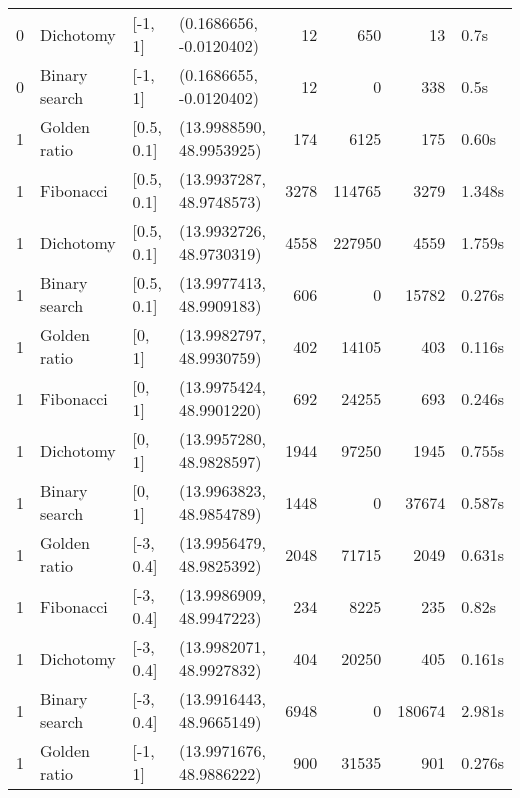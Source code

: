 \documentclass{article}
\begin{document}
\begin{tabular}{rlllrrrl}
        0 &      Dichotomy &     [-1, 1] &   (0.1686656, -0.0120402) &          12 &             650 &              13 &         0.7s \\
        0 &  Binary search &     [-1, 1] &   (0.1686655, -0.0120402) &          12 &               0 &             338 &         0.5s \\
        1 &   Golden ratio &  [0.5, 0.1] &  (13.9988590, 48.9953925) &         174 &            6125 &             175 &        0.60s \\
        1 &      Fibonacci &  [0.5, 0.1] &  (13.9937287, 48.9748573) &        3278 &          114765 &            3279 &       1.348s \\
        1 &      Dichotomy &  [0.5, 0.1] &  (13.9932726, 48.9730319) &        4558 &          227950 &            4559 &       1.759s \\
        1 &  Binary search &  [0.5, 0.1] &  (13.9977413, 48.9909183) &         606 &               0 &           15782 &       0.276s \\
        1 &   Golden ratio &      [0, 1] &  (13.9982797, 48.9930759) &         402 &           14105 &             403 &       0.116s \\
        1 &      Fibonacci &      [0, 1] &  (13.9975424, 48.9901220) &         692 &           24255 &             693 &       0.246s \\
        1 &      Dichotomy &      [0, 1] &  (13.9957280, 48.9828597) &        1944 &           97250 &            1945 &       0.755s \\
        1 &  Binary search &      [0, 1] &  (13.9963823, 48.9854789) &        1448 &               0 &           37674 &       0.587s \\
        1 &   Golden ratio &   [-3, 0.4] &  (13.9956479, 48.9825392) &        2048 &           71715 &            2049 &       0.631s \\
        1 &      Fibonacci &   [-3, 0.4] &  (13.9986909, 48.9947223) &         234 &            8225 &             235 &        0.82s \\
        1 &      Dichotomy &   [-3, 0.4] &  (13.9982071, 48.9927832) &         404 &           20250 &             405 &       0.161s \\
        1 &  Binary search &   [-3, 0.4] &  (13.9916443, 48.9665149) &        6948 &               0 &          180674 &       2.981s \\
        1 &   Golden ratio &     [-1, 1] &  (13.9971676, 48.9886222) &         900 &           31535 &             901 &       0.276s \\

\end{tabular}
\end{document}
